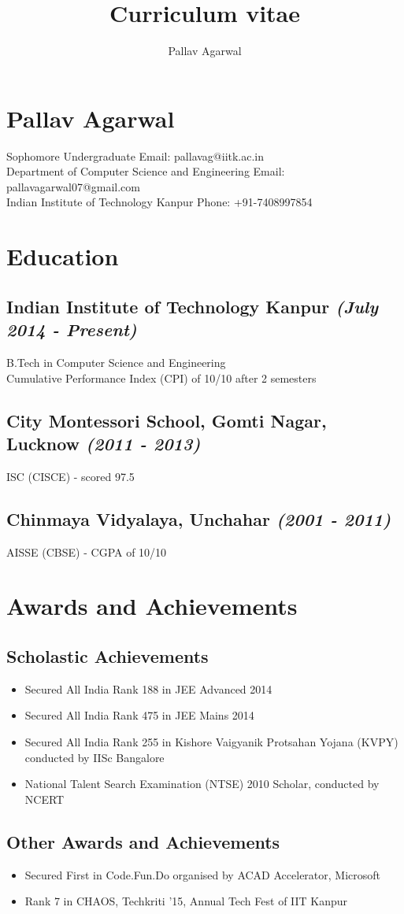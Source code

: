 \documentclass{article}
\title{Curriculum vitae}
\author{Pallav Agarwal}
\begin{document}
    \section*{\huge Pallav Agarwal}
        Sophomore Undergraduate \hfill Email: pallavag@iitk.ac.in \\
        Department of Computer Science and Engineering \hfill Email: pallavagarwal07@gmail.com \\
        Indian Institute of Technology Kanpur \hfill Phone: +91-7408997854 \\
    \section*{Education}
        \hrulefill
        \subsection*{Indian Institute of Technology Kanpur \hfill \textit{\small{(July 2014 - Present)}}}
            B.Tech in Computer Science and Engineering \\
            Cumulative Performance Index (CPI) of 10/10 after 2 semesters 
        \subsection*{City Montessori School, Gomti Nagar, Lucknow \hfill \textit{\small{(2011 - 2013)}}}
            ISC (CISCE) - scored 97.5%
        \subsection*{Chinmaya Vidyalaya, Unchahar \hfill \textit{\small{(2001 - 2011)}}}
            AISSE (CBSE) - CGPA of 10/10 
    \section*{Awards and Achievements}
        \hrulefill
        \subsection*{Scholastic Achievements}
        \begin{itemize}
            \item Secured All India Rank 188 in JEE Advanced 2014
            \item Secured All India Rank 475 in JEE Mains 2014
            \item Secured All India Rank 255 in Kishore Vaigyanik Protsahan Yojana (KVPY) conducted by IISc Bangalore
            \item National Talent Search Examination (NTSE) 2010 Scholar, conducted by NCERT
        \end{itemize}
        \subsection*{Other Awards and Achievements}
        \begin{itemize}
                \item Secured First in Code.Fun.Do organised by ACAD Accelerator, Microsoft
                \item Rank 7 in CHAOS, Techkriti '15, Annual Tech Fest of IIT Kanpur
        \end{itemize}
\end{document}
